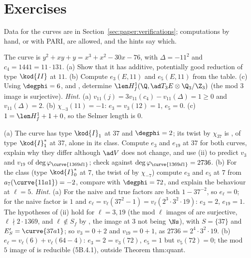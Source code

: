 \begin{sloppypar}
\section{Exercises}\label{sec:paper:exercises}

Data for the curves are in Section~\ref{sec:paper:verifications}; computations by hand, or with PARI, are allowed, and the hints say which.

\begin{exercise}\label{ex:paper:121a1}
The curve  is $y^2+xy+y=x^3+x^2-30x-76$, with $\Delta=-11^2$ and $c_4=1441=11\cdot131$. (a) Show that it has additive, potentially good reduction of type $\kod{II}$ at $11$. (b) Compute
$e_3(E,11)$ and $e_5(E,11)$ from the table. (c) Using $\degphi=6$,  and , determine $\len H^1_f(\Q,\ad T_3E\otimes\Q_3/\Z_3)$ (the mod $3$ image is
surjective).
\emph{Hint.} (a) $v_{11}(j)=3v_{11}(c_4)-v_{11}(\Delta)=1\ge0$ and $v_{11}(\Delta)=2$. (b) $\chi_{-3}(11)=-1$: $e_3=v_3(12)=1$, $e_5=0$. (c) $1=\len H^1_f+1+0$, so the Selmer length is $0$.
\end{exercise}

\begin{exercise}\label{ex:paper:twist-e}
(a) The curve  has type $\kod{I}_1$ at $37$ and $\degphi=2$; its twist by $\chi_{37}$ is , of type $\kod{I}_1^*$ at $37$, alone in its class. Compute $e_3$ and
$e_{19}$ at $37$ for both curves, explain why they differ although $\ad V$ does not change, and use (ii) to predict $v_3$ and $v_{19}$ of $\deg\varphi_{\curve{1369d1}}$; check
against $\deg\varphi_{\curve{1369d1}}=2736$. (b) For the class  (type $\kod{I}_0^*$ at $7$, the twist of  by $\chi_{-7}$) compute $e_3$ and $e_5$ at $7$ from $a_7(\curve{11a1})=-2$,
compare with $\degphi=72$, and explain the behaviour at $\ell=5$.
\emph{Hint.} (a) For  the naive and true factors are both $1-37^{-2}$, so $e_\ell=0$; for  the naive factor is $1$ and $e_\ell=v_\ell(37^2-1)=v_\ell(2^3\cdot3^2\cdot19)$: $e_3=2$,
$e_{19}=1$. The hypotheses of (ii) hold for $\ell=3,19$ (the mod $\ell$ images of  are surjective, $\ell\nmid2\cdot1369$, and $\ell\notin S_f$ by , the image at $3$ not being
$\Ns$), with $S=\{37\}$ and $E'_S=\curve{37a1}$; so $v_3=0+2$ and $v_{19}=0+1$, as $2736=2^4\cdot3^2\cdot19$. (b) $e_\ell=v_\ell(6)+v_\ell(64-4)$: $e_3=2=v_3(72)$, $e_5=1$ but $v_5(72)=0$; the
mod $5$ image of  is reducible (5B.4.1), outside Theorem thm:quant.
\end{exercise}


\end{sloppypar}
